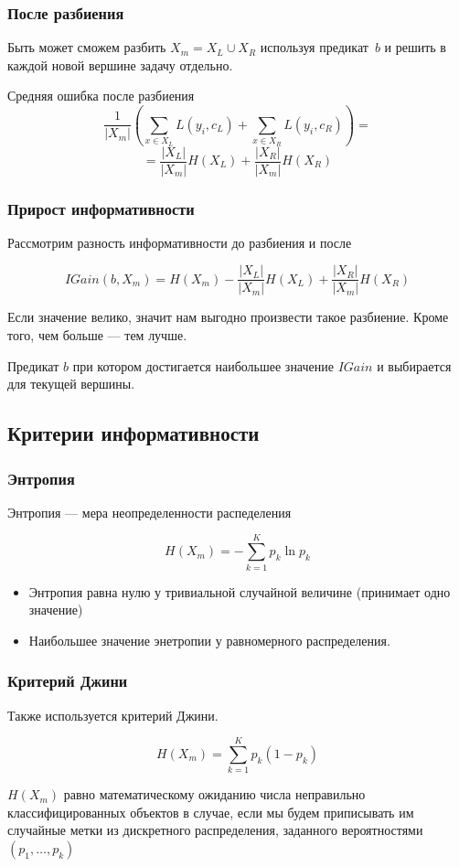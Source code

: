 \documentclass{beamer}
\begin{document}
	\begin{frame}
		\frametitle{После разбиения}

		Быть может сможем разбить $X_m = X_L \cup X_R$  используя предикат~$b$ и решить в каждой новой вершине задачу отдельно.

		\vspace{15pt}

		Средняя ошибка после разбиения
		\[
		\frac{1}{|X_m|} \left( \sum_{x \in X_L} L(y_i, c_L) + \sum_{x \in X_R} L(y_i, c_R) \right)
		=
		\]
		\[
		= \frac{|X_L|}{|X_m|} H(X_L) + \frac{|X_R|}{|X_m|} H(X_R)
		\]
	\end{frame}

	\begin{frame}
		\frametitle{Прирост информативности}

		Рассмотрим разность информативности до разбиения и после

		\[
		IGain(b, X_m) = H(X_m) - \frac{|X_L|}{|X_m|} H(X_L) + \frac{|X_R|}{|X_m|} H(X_R)
		\]

		Если значение велико, значит нам выгодно произвести такое разбиение. Кроме того,
		чем больше --- тем лучше. 

		\vspace{15pt}

		Предикат $b$ при котором достигается наибольшее значение $IGain$ и выбирается для текущей вершины.
	\end{frame}

	\subsection{Критерии информативности}

	\begin{frame}
		\frametitle{Энтропия}

		Энтропия --- мера неопределенности распеделения

		\[
		H(X_m) = - \sum_{k=1}^{K} p_k \ln p_k
		\]

		\begin{itemize}
			\item Энтропия равна нулю у тривиальной случайной величине (принимает одно значение)
			\item Наибольшее значение энетропии у равномерного распределения.
		\end{itemize}
	\end{frame}

	\begin{frame}
		\frametitle{Критерий Джини}
		Также используется критерий Джини.

		\[
		H(X_m) = \sum_{k=1}^{K} p_k (1 - p_k)
		\]

		$H(X_m)$ равно математическому ожиданию числа неправильно классифицированных объектов в случае, 
		если мы будем приписывать им случайные метки из дискретного распределения, заданного вероятностями
		$(p_1, \dots, p_k)$
	\end{frame}
\end{document}
